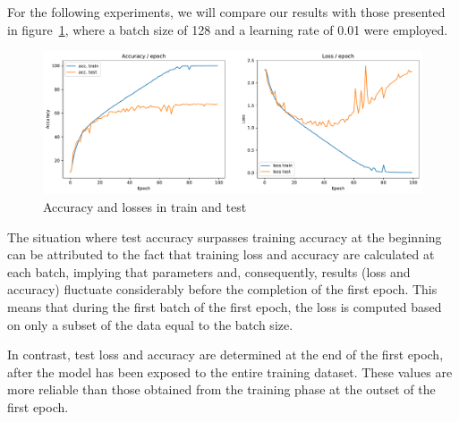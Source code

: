 \documentclass{article}
\theoremstyle{plain}%
\theoremstyle{definition}
\theoremstyle{remark}
\begin{document}
For the following experiments, we will compare our results with those presented in figure~\ref{fig:base_result}, where a batch size of 128 and a learning rate of 0.01 were employed.

\begin{figure}[H]
    \centering
    \includegraphics*[width=\textwidth]{figs/CNN/base_result.pdf}
    \caption{Accuracy and losses in train and test}
    \label{fig:base_result}
\end{figure}


The situation where test accuracy surpasses training accuracy at the beginning can be attributed to the fact that training loss and accuracy are calculated at each batch, implying that parameters and, consequently, results (loss and accuracy) fluctuate considerably before the completion of the first epoch. This means that during the first batch of the first epoch, the loss is computed based on only a subset of the data equal to the batch size.

In contrast, test loss and accuracy are determined at the end of the first epoch, after the model has been exposed to the entire training dataset. These values are more reliable than those obtained from the training phase at the outset of the first epoch.


\end{document}

